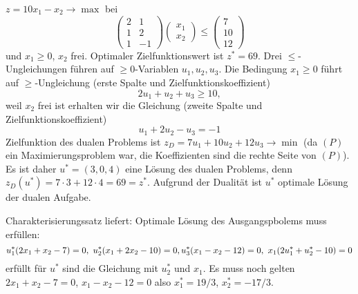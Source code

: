 \begin{solution}
    \begin{tasks}
    \item
    $z=10x_1-x_2\to\max$ bei
    $$
    \begin{pmatrix}
        2 & 1 \\
        1 & 2 \\
        1 & -1 
    \end{pmatrix}
    \begin{pmatrix}
        x_1 \\
        x_2
    \end{pmatrix}
    \leq
    \begin{pmatrix}
        7 \\
        10 \\
        12
    \end{pmatrix}
    $$
    und $x_1\geq 0$, $x_2$ frei. Optimaler Zielfunktionswert ist $z^\ast=69$. Drei $\leq$-Ungleichungen führen auf $\geq 0$-Variablen $u_1,u_2,u_3$.
    Die Bedingung $x_1\geq 0$ führt auf $\geq$-Ungleichung (erste Spalte und Zielfunktionskoeffizient)
    $$
    2u_1+u_2+u_3\geq 10,
    $$
    weil $x_2$ frei ist erhalten wir die Gleichung (zweite Spalte und Zielfunktionskoeffizient)
    $$
    u_1+2u_2-u_3=-1
    $$
    Zielfunktion des dualen Problems ist $z_D=7u_1+10u_2+12u_3\to\min$ (da $(P)$ ein Maximierungsproblem war, die Koeffizienten sind die rechte Seite von $(P)$).
    Es ist daher $u^\ast=(3,0,4)$ eine Lösung des dualen Problems, denn $z_D(u^\ast)=7\cdot 3+12\cdot 4=69=z^\ast$. Aufgrund der Dualität ist $u^\ast$ optimale Lösung der dualen Aufgabe.
        \item Charakterisierungssatz liefert: Optimale Lösung des Ausgangspbolems muss erfüllen:
    $$
    u_1^\ast(2x_1+x_2-7)=0,\ u_2^\ast(x_1+2x_2-10)=0,\\
    u_3^\ast(x_1-x_2-12)=0,\ x_1(2u_1^\ast+u_2^\ast-10)=0
    $$
    erfüllt für $u^\ast$ sind die Gleichung mit $u_2^\ast$ und $x_1$. Es muss noch gelten $2x_1+x_2-7=0$, $x_1-x_2-12=0$ also $x_1^\ast=19/3$, $x_2^\ast=-17/3$.
\end{tasks}
\end{solution}



















